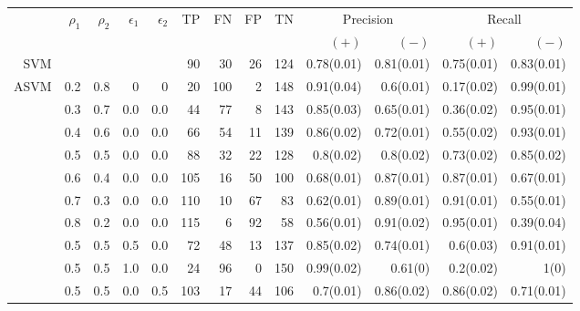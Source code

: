 \documentclass[twoside,11pt]{article}
\begin{document}
          


\begin{table}[htp]
  \centering
    \tiny\begin{tabular}{rrrrr|rrrrrrrr}
    \hline
    &\multirow{2}{*}{$\rho_1$} & \multirow{2}{*}{$\rho_2$} & \multirow{2}{*}{$\epsilon_1$} & \multirow{2}{*}{$\epsilon_2$} & \multirow{2}{*}{TP}    & \multirow{2}{*}{FN}    & \multirow{2}{*}{FP}    & \multirow{2}{*}{TN} & \multicolumn{2}{c}{Precision} & \multicolumn{2}{c}{Recall}\\
    &&&&&&&&&  $(+)$ &  $(-)$ &  $(+)$ &  $(-)$ \bigstrut\\

\hline
\hline
SVM &       &       &       &       & 90    & 30    & 26    & 124   & 0.78(0.01) & 0.81(0.01) & 0.75(0.01) & 0.83(0.01) \bigstrut\\
\hline
\multirow{13}[2]{*}{ASVM} & 0.2   & 0.8   & 0     & 0     & 20    & 100   & 2     & 148   & 0.91(0.04) & 0.6(0.01) & 0.17(0.02) & 0.99(0.01) \bigstrut[t]\\
      & 0.3   & 0.7   & 0.0   & 0.0   & 44    & 77    & 8     & 143   & 0.85(0.03) & 0.65(0.01) & 0.36(0.02) & 0.95(0.01) \\
      & 0.4   & 0.6   & 0.0   & 0.0   & 66    & 54    & 11    & 139   & 0.86(0.02) & 0.72(0.01) & 0.55(0.02) & 0.93(0.01) \\
      & 0.5   & 0.5   & 0.0   & 0.0   & 88    & 32    & 22    & 128   & 0.8(0.02) & 0.8(0.02) & 0.73(0.02) & 0.85(0.02) \\
      & 0.6   & 0.4   & 0.0   & 0.0   & 105   & 16    & 50    & 100   & 0.68(0.01) & 0.87(0.01) & 0.87(0.01) & 0.67(0.01) \\
      & 0.7   & 0.3   & 0.0   & 0.0   & 110   & 10    & 67    & 83    & 0.62(0.01) & 0.89(0.01) & 0.91(0.01) & 0.55(0.01) \\
      & 0.8   & 0.2   & 0.0   & 0.0   & 115   & 6     & 92    & 58    & 0.56(0.01) & 0.91(0.02) & 0.95(0.01) & 0.39(0.04) \\
      & 0.5   & 0.5   & 0.5   & 0.0   & 72    & 48    & 13    & 137   & 0.85(0.02) & 0.74(0.01) & 0.6(0.03) & 0.91(0.01) \\
      & 0.5   & 0.5   & 1.0   & 0.0   & 24    & 96    & 0     & 150   & 0.99(0.02) & 0.61(0) & 0.2(0.02) & 1(0) \\
      & 0.5   & 0.5   & 0.0   & 0.5   & 103   & 17    & 44    & 106   & 0.7(0.01) & 0.86(0.02) & 0.86(0.02) & 0.71(0.01) \\

\end{tabular}
\end{table}
\end{document}
